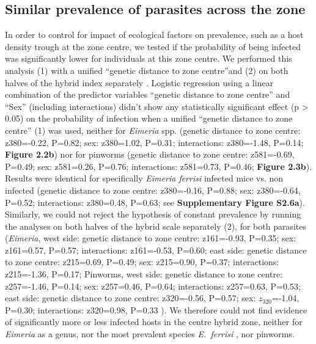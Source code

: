 \subsection{Similar prevalence of parasites across the zone}
In order to control for impact of ecological factors on prevalence, such as a host density trough at the zone centre, we tested if the probability of being infected was significantly lower for individuals at this zone centre. We performed this analysis (1) with a unified “genetic distance to zone centre”and (2) on both halves of the hybrid index separately . Logistic regression using a linear combination of the predictor variables “genetic distance to zone centre” and “Sex” (including interactions) didn’t show any statistically significant effect (p > 0.05) on the probability of infection when a unified “genetic distance to zone centre” (1) was used, neither for \textit{Eimeria} spp. (genetic distance to zone centre: z380=-0.22, P=0.82; sex: z380=1.02, P=0.31; interactions: z380=-1.48, P=0.14; \textbf{Figure 2.2b}) nor for pinworms (genetic distance to zone centre: z581=-0.69, P=0.49; sex: z581=0.26, P=0.76; interactions: z581=0.73, P=0.46; \textbf{Figure 2.3b}). Results were identical for specifically \textit{Eimeria ferrisi} infected mice vs. non infected (genetic distance to zone centre: z380=-0.16, P=0.88; sex: z380=-0.64, P=0.52; interactions: z380=0.48, P=0.63; see \textbf{Supplementary Figure S2.6a}). Similarly, we could not reject the hypothesis of constant prevalence by running the analyses on both halves of the hybrid scale separately (2), for both parasites (\textit{Eimeria}, west side: genetic distance to zone centre: z161=-0.93, P=0.35; sex: z161=0.57, P=0.57; interactions: z161=-0.53, P=0.60; east side: genetic distance to zone centre: z215=0.69, P=0.49; sex: z215=0.90, P=0.37; interactions: z215=-1.36, P=0.17; Pinworms, west side: genetic distance to zone centre: z257=-1.46, P=0.14; sex: z257=0.46, P=0.64; interactions: z257=0.63, P=0.53; east side: genetic distance to zone centre: z320=-0.56, P=0.57; sex: $z_320$=-1.04, P=0.30; interactions: z320=0.98, P=0.33 ). We therefore could not find evidence of significantly more or less infected hosts in the centre hybrid zone, neither for \textit{Eimeria} as a genus, nor the most prevalent species \textit{E.~ferrisi} , nor pinworms. 

